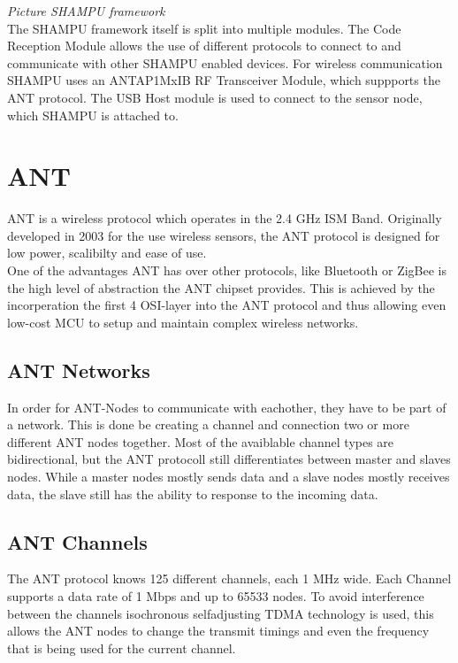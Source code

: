 \textit{Picture SHAMPU framework}\\

The SHAMPU framework itself is split into multiple modules. The Code Reception Module allows the use of different protocols to connect to and communicate with other SHAMPU enabled devices. For wireless communication SHAMPU uses an ANTAP1MxIB RF Transceiver Module, which suppports the ANT protocol. The USB Host module is used to connect to the sensor node, which SHAMPU is attached to.

\section{ANT}
ANT \cite{DynastreamInnovationsInc.2013} is a wireless protocol which operates in the 2.4 GHz ISM Band. Originally developed in 2003 for the use wireless sensors, the ANT protocol is designed for low power, scalibilty and ease of use.\\
One of the advantages ANT has over other protocols, like Bluetooth or ZigBee is the high level of abstraction the ANT chipset provides. This is achieved by the incorperation the first 4 OSI-layer into the ANT protocol and thus allowing even low-cost MCU to setup and maintain complex wireless networks.\\

\subsection{ANT Networks}
In order for ANT-Nodes to communicate with eachother, they have to be part of a network. This is done be creating a channel and connection two or more different ANT nodes together. Most of the avaiblable channel types are bidirectional, but the ANT protocoll still differentiates between master and slaves nodes. While a master nodes mostly sends data and a slave nodes mostly receives data, the slave still has the ability to response to the incoming data.

\subsection{ANT Channels}
The ANT protocol knows 125 different channels, each 1 MHz wide. Each Channel supports a data rate of 1 Mbps and up to 65533 nodes. To avoid interference between the channels isochronous selfadjusting TDMA technology is used, this allows the ANT nodes to change the transmit timings and even the frequency that is being used for the current channel.


